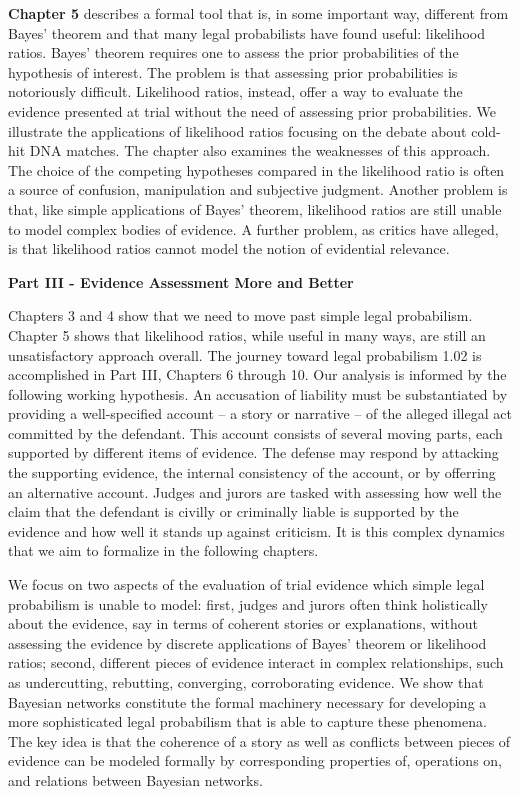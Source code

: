 \documentclass[10pt,dvipsnames,enabledeprecatedfontcommands]{scrartcl}
\begin{document}
\textbf{Chapter 5} describes a formal tool that is, in some important
way, different from Bayes' theorem and that many legal probabilists have
found useful: likelihood ratios. Bayes' theorem requires one to assess
the prior probabilities of the hypothesis of interest. The problem is
that assessing prior probabilities is notoriously difficult. Likelihood
ratios, instead, offer a way to evaluate the evidence presented at trial
without the need of assessing prior probabilities. We illustrate the
applications of likelihood ratios focusing on the debate about cold-hit
DNA matches. The chapter also examines the weaknesses of this approach.
The choice of the competing hypotheses compared in the likelihood ratio
is often a source of confusion, manipulation and subjective judgment.
Another problem is that, like simple applications of Bayes' theorem,
likelihood ratios are still unable to model complex bodies of evidence.
A further problem, as critics have alleged, is that likelihood ratios
cannot model the notion of evidential relevance.

\vspace{3mm}

\noindent \textbf{Part III - Evidence Assessment More and Better}

\noindent Chapters 3 and 4 show that we need to move past simple legal
probabilism. Chapter 5 shows that likelihood ratios, while useful in
many ways, are still an unsatisfactory approach overall. The journey
toward legal probabilism 1.02 is accomplished in Part III, Chapters 6
through 10. Our analysis is informed by the following working
hypothesis. An accusation of liability must be substantiated by
providing a well-specified account -- a story or narrative -- of the
alleged illegal act committed by the defendant. This account consists of
several moving parts, each supported by different items of evidence. The
defense may respond by attacking the supporting evidence, the internal
consistency of the account, or by offerring an alternative account.
Judges and jurors are tasked with assessing how well the claim that the
defendant is civilly or criminally liable is supported by the evidence
and how well it stands up against criticism. It is this complex dynamics
that we aim to formalize in the following chapters.

We focus on two aspects of the evaluation of trial evidence which simple
legal probabilism is unable to model: first, judges and jurors often
think holistically about the evidence, say in terms of coherent stories
or explanations, without assessing the evidence by discrete applications
of Bayes' theorem or likelihood ratios; second, different pieces of
evidence interact in complex relationships, such as undercutting,
rebutting, converging, corroborating evidence. We show that Bayesian
networks constitute the formal machinery necessary for developing a more
sophisticated legal probabilism that is able to capture these phenomena.
The key idea is that the coherence of a story as well as conflicts
between pieces of evidence can be modeled formally by corresponding
properties of, operations on, and relations between Bayesian networks.
\end{document}
